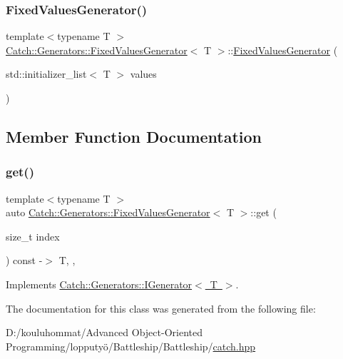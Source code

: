 \subsubsection{\texorpdfstring{Fixed\+Values\+Generator()}{FixedValuesGenerator()}}
{\footnotesize\ttfamily template$<$typename T $>$ \\
\mbox{\hyperlink{class_catch_1_1_generators_1_1_fixed_values_generator}{Catch\+::\+Generators\+::\+Fixed\+Values\+Generator}}$<$ T $>$\+::\mbox{\hyperlink{class_catch_1_1_generators_1_1_fixed_values_generator}{Fixed\+Values\+Generator}} (\begin{DoxyParamCaption}\item[{std\+::initializer\+\_\+list$<$ T $>$}]{values }\end{DoxyParamCaption})\hspace{0.3cm}{\ttfamily [inline]}}



\subsection{Member Function Documentation}
\mbox{\label{class_catch_1_1_generators_1_1_fixed_values_generator_a3ed654a5860c170dbe7b01487b83253d}} 
\subsubsection{\texorpdfstring{get()}{get()}}
{\footnotesize\ttfamily template$<$typename T $>$ \\
auto \mbox{\hyperlink{class_catch_1_1_generators_1_1_fixed_values_generator}{Catch\+::\+Generators\+::\+Fixed\+Values\+Generator}}$<$ T $>$\+::get (\begin{DoxyParamCaption}\item[{size\+\_\+t}]{index }\end{DoxyParamCaption}) const -\/$>$ T\hspace{0.3cm}{\ttfamily [inline]}, {\ttfamily [override]}, {\ttfamily [virtual]}}



Implements \mbox{\hyperlink{struct_catch_1_1_generators_1_1_i_generator_a737a89eb0bff02e580e36c59fb0d1171}{Catch\+::\+Generators\+::\+I\+Generator$<$ T $>$}}.



The documentation for this class was generated from the following file\+:\begin{DoxyCompactItemize}
\item 
D\+:/kouluhommat/\+Advanced Object-\/\+Oriented Programming/lopputyö/\+Battleship/\+Battleship/\mbox{\hyperlink{catch_8hpp}{catch.\+hpp}}\end{DoxyCompactItemize}

